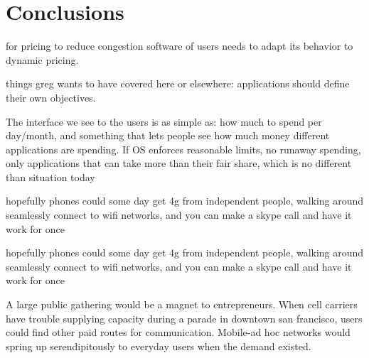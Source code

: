\section{Conclusions}
for pricing to reduce congestion software of users needs to adapt its behavior to dynamic pricing.

things greg wants to have covered here or elsewhere:
applications should define their own objectives.

The interface we see to the users is as simple as: how much to spend per day/month, and something that lets people see how much money different applications are spending. If OS enforces reasonable limits, no runaway spending, only applications that can take more than their fair share, which is no different than situation today

hopefully phones could some day get 4g from independent people, walking around seamlessly connect to wifi networks, and you can make a skype call and have it work for once

hopefully phones could some day get 4g from independent people, walking around seamlessly connect to wifi networks, and you can make a skype call and have it work for once

A large public gathering would be a magnet to entrepreneurs. When cell carriers have trouble supplying capacity during a parade in downtown san francisco, users could find other paid routes for communication. Mobile-ad hoc networks would spring up serendipitously to everyday users when the demand existed.
\label{sec:conc}

